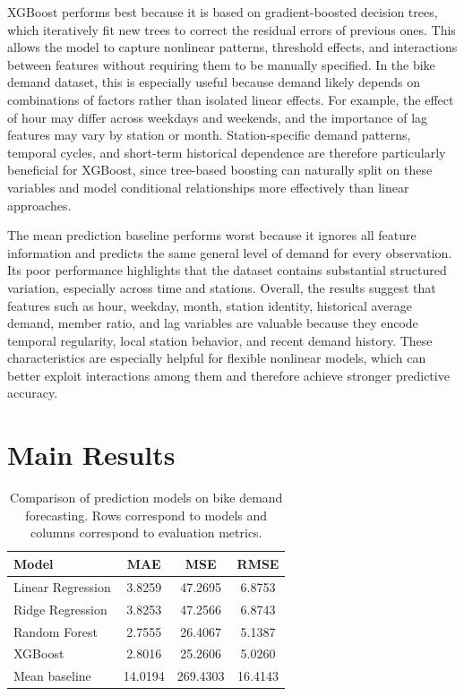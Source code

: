 \documentclass[11pt]{article}
\begin{document}
XGBoost performs best because it is based on gradient-boosted decision trees, which iteratively fit new trees to correct the residual errors of previous ones. This allows the model to capture nonlinear patterns, threshold effects, and interactions between features without requiring them to be manually specified. In the bike demand dataset, this is especially useful because demand likely depends on combinations of factors rather than isolated linear effects. For example, the effect of hour may differ across weekdays and weekends, and the importance of lag features may vary by station or month. Station-specific demand patterns, temporal cycles, and short-term historical dependence are therefore particularly beneficial for XGBoost, since tree-based boosting can naturally split on these variables and model conditional relationships more effectively than linear approaches.

The mean prediction baseline performs worst because it ignores all feature information and predicts the same general level of demand for every observation. Its poor performance highlights that the dataset contains substantial structured variation, especially across time and stations. Overall, the results suggest that features such as hour, weekday, month, station identity, historical average demand, member ratio, and lag variables are valuable because they encode temporal regularity, local station behavior, and recent demand history. These characteristics are especially helpful for flexible nonlinear models, which can better exploit interactions among them and therefore achieve stronger predictive accuracy.

\section*{Main Results}
\begin{table}[htbp]
    \centering
    \caption{Comparison of prediction models on bike demand forecasting. Rows correspond to models and columns correspond to evaluation metrics.}
    \label{tab:model_comparison}
    \begin{tabular}{|l|c|c|c|}
        \hline
        Model             & MAE     & MSE      & RMSE    \\
        \hline
        Linear Regression & 3.8259  & 47.2695  & 6.8753  \\
        Ridge Regression  & 3.8253  & 47.2566  & 6.8743  \\
        Random Forest     & 2.7555  & 26.4067  & 5.1387  \\
        XGBoost           & 2.8016  & 25.2606  & 5.0260  \\
        Mean baseline     & 14.0194 & 269.4303 & 16.4143 \\
        \hline
    \end{tabular}
\end{table}
\end{document}
